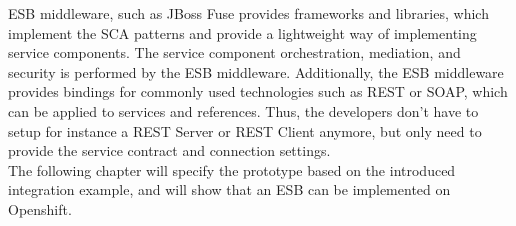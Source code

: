 ESB middleware, such as JBoss Fuse provides frameworks and libraries, which implement the SCA patterns and provide a lightweight way of implementing service components. The service component orchestration, mediation, and security is performed by the ESB middleware. Additionally, the ESB middleware provides bindings for commonly used technologies such as REST or SOAP, which can be applied to services and references. Thus, the developers don't have to setup for instance a REST Server or REST Client anymore, but only need to provide the service contract and connection settings\cite{MicroSoa2008, Richards2015}.\\

The following chapter will specify the prototype based on the introduced integration example, and will show that an ESB can be implemented on Openshift.